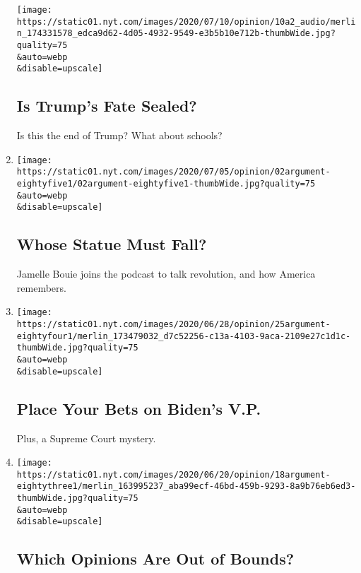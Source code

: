 \begin{enumerate}
  \texttt{[image: https://static01.nyt.com/images/2020/07/10/opinion/10a2\_audio/merlin\_174331578\_edca9d62-4d05-4932-9549-e3b5b10e712b-thumbWide.jpg?quality=75\\\&auto=webp\\\&disable=upscale]}

  \hypertarget{is-trumps-fate-sealed}{%
  \subsection{Is Trump's Fate Sealed?}\label{is-trumps-fate-sealed}}

  Is this the end of Trump? What about schools?
\item
  \href{/2020/07/02/opinion/the-argument-protest-statue-revolution.html}{}

  \texttt{[image: https://static01.nyt.com/images/2020/07/05/opinion/02argument-eightyfive1/02argument-eightyfive1-thumbWide.jpg?quality=75\\\&auto=webp\\\&disable=upscale]}

  \hypertarget{whose-statue-must-fall}{%
  \subsection{Whose Statue Must Fall?}\label{whose-statue-must-fall}}

  Jamelle Bouie joins the podcast to talk revolution, and how America
  remembers.
\item
  \href{/2020/06/25/opinion/the-argument-biden-vice-president-supreme-court.html}{}

  \texttt{[image: https://static01.nyt.com/images/2020/06/28/opinion/25argument-eightyfour1/merlin\_173479032\_d7c52256-c13a-4103-9aca-2109e27c1d1c-thumbWide.jpg?quality=75\\\&auto=webp\\\&disable=upscale]}

  \hypertarget{place-your-bets-on-bidens-vp}{%
  \subsection{Place Your Bets on Biden's
  V.P.}\label{place-your-bets-on-bidens-vp}}

  Plus, a Supreme Court mystery.
\item
  \href{/2020/06/18/opinion/the-argument-tom-cotton-resignation.html}{}

  \texttt{[image: https://static01.nyt.com/images/2020/06/20/opinion/18argument-eightythree1/merlin\_163995237\_aba99ecf-46bd-459b-9293-8a9b76eb6ed3-thumbWide.jpg?quality=75\\\&auto=webp\\\&disable=upscale]}

  \hypertarget{which-opinions-are-out-of-bounds}{%
  \subsection{Which Opinions Are Out of
  Bounds?}\label{which-opinions-are-out-of-bounds}}


\end{enumerate}
